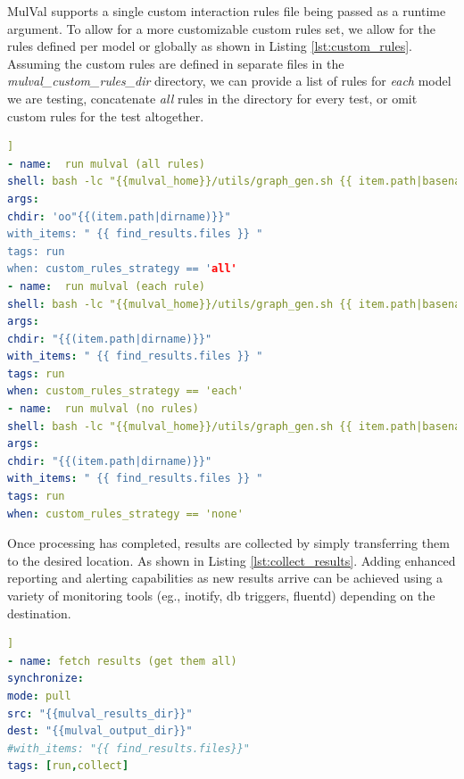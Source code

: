 MulVal supports a single custom interaction rules file being passed as a runtime argument. To allow for a more customizable custom rules set, we allow for the rules defined per model or globally as shown in Listing \ref{lst:custom_rules}. Assuming the custom rules are defined in separate files in the \textit{mulval\_custom\_rules\_dir} directory, we can provide a list of rules for \textit{each} model we are testing, concatenate \textit{all} rules in the directory for every test, or omit custom rules for the test altogether. 

\begin{lstlisting}[language=yaml, label={lst:custom_rules}, caption={Custom rule strategies},captionpos=b,]]
- name:  run mulval (all rules)
shell: bash -lc "{{mulval_home}}/utils/graph_gen.sh {{ item.path|basename }} -p -v -a {{custom_rules_dir}}/custom_rules.P"
args:
chdir: 'oo"{{(item.path|dirname)}}"
with_items: " {{ find_results.files }} "
tags: run
when: custom_rules_strategy == 'all'
- name:  run mulval (each rule)
shell: bash -lc "{{mulval_home}}/utils/graph_gen.sh {{ item.path|basename }} -p -v -a {{custom_rules_dir}}/{{ item.path|basename }}.rules  "
args:
chdir: "{{(item.path|dirname)}}"
with_items: " {{ find_results.files }} "
tags: run
when: custom_rules_strategy == 'each'
- name:  run mulval (no rules)
shell: bash -lc "{{mulval_home}}/utils/graph_gen.sh {{ item.path|basename }} -p -v"
args:
chdir: "{{(item.path|dirname)}}"
with_items: " {{ find_results.files }} "
tags: run
when: custom_rules_strategy == 'none'
\end{lstlisting}

Once processing has completed, results are collected by simply transferring them to the desired location. As shown in Listing \ref{lst:collect_results}. Adding enhanced reporting and alerting capabilities as new results arrive can be achieved using a variety of monitoring tools (eg., inotify, db triggers, fluentd) depending on the destination.

\begin{minipage}{.95\linewidth}
\begin{lstlisting}[language=yaml, label={lst:collect_results}, caption={Collect Results},captionpos=b, ]]
- name: fetch results (get them all)
synchronize:
mode: pull
src: "{{mulval_results_dir}}"
dest: "{{mulval_output_dir}}"
#with_items: "{{ find_results.files}}"
tags: [run,collect]
\end{lstlisting}
\end{minipage}